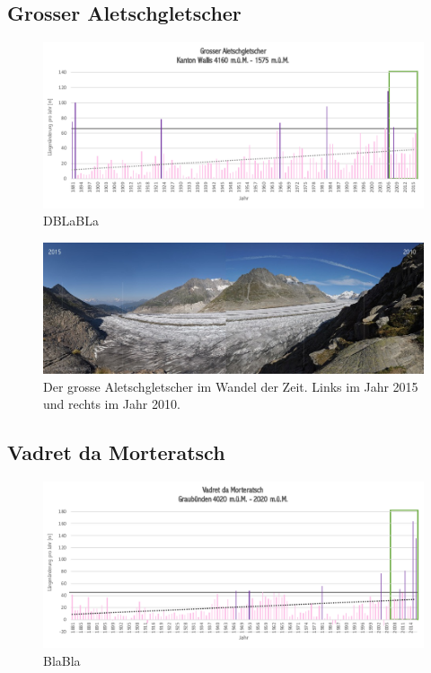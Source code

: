 \begin{refsection}
\subsection{Grosser Aletschgletscher}

\begin{figure}[htbp]
\centering
\includegraphics[width=1.0\textwidth]{extrem/Aletsch.pdf}
\caption{DBLaBLa}
\label{AletschTab}
\end{figure}



\begin{figure}[htbp]
\centering
\includegraphics[width=1.0\textwidth]{extrem/Aletsch.jpg}
\caption{Der grosse Aletschgletscher im Wandel der Zeit. Links im Jahr 2015 und rechts im Jahr 2010.}
\label{Aletsch}
\end{figure}

\subsection{Vadret da Morteratsch}



\begin{figure}[htbp]
\centering
\includegraphics[width=1.0\textwidth]{extrem/Morteratsch.pdf}
\caption{BlaBla}
\label{Morteratschtab}
\end{figure}



\end{refsection}

